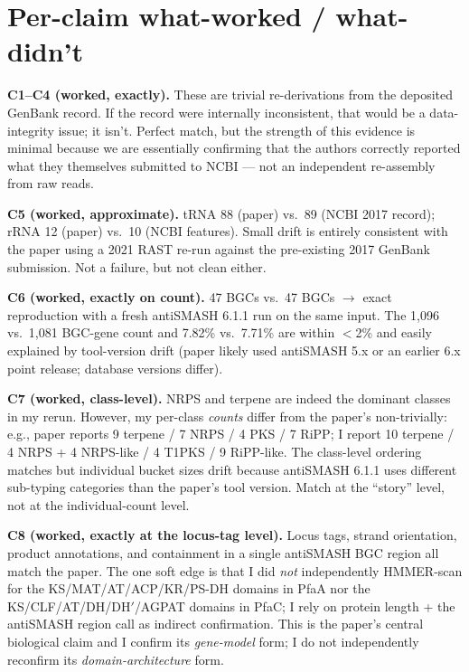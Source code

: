 \documentclass[11pt,letterpaper]{article}
\begin{document}
\section{Per-claim what-worked / what-didn't}

\textbf{C1--C4 (worked, exactly).} These are trivial re-derivations from the deposited GenBank record. If the record were internally inconsistent, that would be a data-integrity issue; it isn't. Perfect match, but the strength of this evidence is minimal because we are essentially confirming that the authors correctly reported what they themselves submitted to NCBI --- not an independent re-assembly from raw reads.

\textbf{C5 (worked, approximate).} tRNA 88 (paper) vs.\ 89 (NCBI 2017 record); rRNA 12 (paper) vs.\ 10 (NCBI features). Small drift is entirely consistent with the paper using a 2021 RAST re-run against the pre-existing 2017 GenBank submission. Not a failure, but not clean either.

\textbf{C6 (worked, exactly on count).} 47 BGCs vs.\ 47 BGCs $\to$ exact reproduction with a fresh antiSMASH 6.1.1 run on the same input. The 1{,}096 vs.\ 1{,}081 BGC-gene count and 7.82\% vs.\ 7.71\% are within $<$2\% and easily explained by tool-version drift (paper likely used antiSMASH 5.x or an earlier 6.x point release; database versions differ).

\textbf{C7 (worked, class-level).} NRPS and terpene are indeed the dominant classes in my rerun. However, my per-class \emph{counts} differ from the paper's non-trivially: e.g., paper reports 9 terpene / 7 NRPS / 4 PKS / 7 RiPP; I report 10 terpene / 4 NRPS + 4 NRPS-like / 4 T1PKS / 9 RiPP-like. The class-level ordering matches but individual bucket sizes drift because antiSMASH 6.1.1 uses different sub-typing categories than the paper's tool version. Match at the ``story'' level, not at the individual-count level.

\textbf{C8 (worked, exactly at the locus-tag level).} Locus tags, strand orientation, product annotations, and containment in a single antiSMASH BGC region all match the paper. The one soft edge is that I did \emph{not} independently HMMER-scan for the KS/MAT/AT/ACP/KR/PS-DH domains in PfaA nor the KS/CLF/AT/DH/DH$'$/AGPAT domains in PfaC; I rely on protein length + the antiSMASH region call as indirect confirmation. This is the paper's central biological claim and I confirm its \emph{gene-model} form; I do not independently reconfirm its \emph{domain-architecture} form.
\end{document}
